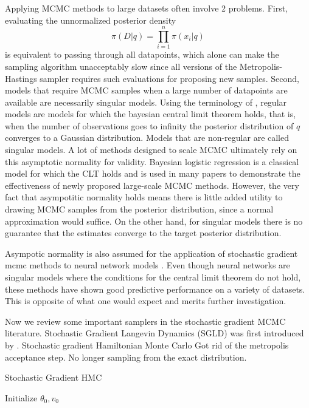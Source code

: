 \documentclass[]{report}
\begin{document}
Applying MCMC methods to large datasets often involve 2 problems. First, evaluating the unnormalized posterior density
\[ \pi(D|q) = \prod_{i=1}^n \pi(x_i|q) \]
 is equivalent to passing through all datapoints, which alone can make the sampling algorithm unacceptably slow since all versions of the Metropolis-Hastings sampler requires such evaluations for proposing new samples. Second, models that require MCMC samples when a large number of datapoints are available are necessarily singular models. Using the terminology of \cite{watanabe2009algebraic}, regular models are models for which the bayesian central limit theorem \cite{le2012asymptotic} holds, that is, when the number of observations goes to infinity the posterior distribution of $q$ converges to a Gaussian distribution. Models that are non-regular are called singular models. A lot of methods designed to scale MCMC \cite{neiswanger2013asymptotically,scott2016bayes,} ultimately rely on this asymptotic normality for validity. Bayesian logistic regression is a classical model for which the CLT holds and is used in many papers to demonstrate the effectiveness of newly proposed large-scale MCMC methods. However, the very fact that asympotitic normality holds means there is little added utility to drawing MCMC samples from the posterior distribution, since a normal approximation would suffice. On the other hand, for singular models there is no guarantee that the estimates converge to the target posterior distribution. 

Asympotic normality is also assumed for the application of stochastic gradient mcmc methods to neural network models \cite{welling2011bayesian,chen2014stochastic,ahn2012bayesian,ding2014bayesian,ma2015complete}. Even though neural networks are singular models where the conditions for the central limit theorem do not hold, these methods have shown good predictive performance on a variety of datasets. This is opposite of what one would expect and merits further investigation.







Now we review some important samplers in the stochastic gradient MCMC
literature. Stochastic Gradient Langevin Dynamics (SGLD) was first introduced by
\cite{welling2011bayesian}. 
Stochastic gradient Hamiltonian Monte Carlo
Got rid of the metropolis acceptance step. No longer sampling from the exact
distribution.

\begin{algorithm}
    \caption{Stochastic Gradient HMC}
        Initialize $\theta_0,v_0$ \;
\end{algorithm}
\end{document}
